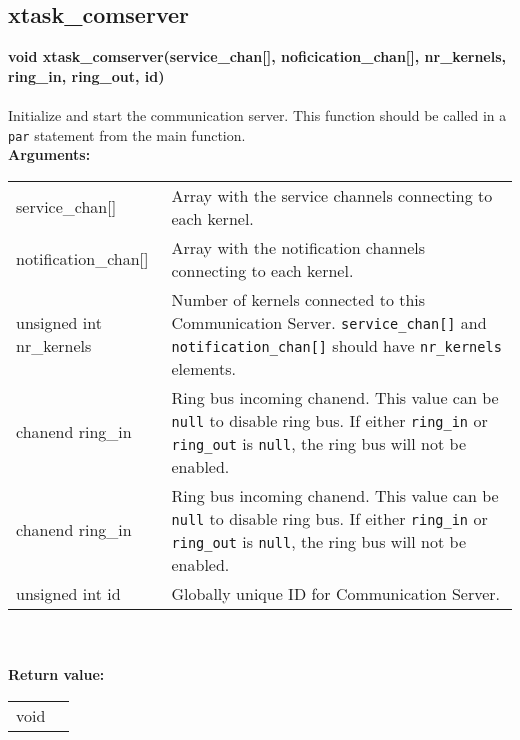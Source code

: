 \subsection{xtask\_comserver}
\noindent
\textbf{void xtask\_comserver(service\_chan[], noficication\_chan[], nr\_kernels, 
        ring\_in, ring\_out, id)}\\\\
Initialize and start the communication server.
This function should be called in a \verb|par| statement from the main function.\\

\noindent
\textbf{Arguments:}\\
\indent\begin{tabular}{ p{4.5cm}  p{9cm} }
service\_chan[]      & Array with the service channels connecting 
                       to each kernel.\\
notification\_chan[] & Array with the notification channels connecting
                       to each kernel.\\
unsigned int
nr\_kernels          & Number of kernels connected to this Communication Server.
                       \verb|service_chan[]| and \verb|notification_chan[]|
                       should have \verb|nr_kernels| elements.\\
chanend
ring\_in             & Ring bus incoming chanend. This value can be \verb|null|
                       to disable ring bus. If either \verb|ring_in| 
                       or \verb|ring_out| is \verb|null|,
                       the ring bus will not be enabled.\\
chanend
ring\_in             & Ring bus incoming chanend. This value can be \verb|null|
                       to disable ring bus. If either \verb|ring_in| 
                       or \verb|ring_out| is \verb|null|,
                       the ring bus will not be enabled.\\
unsigned int id      & Globally unique ID for Communication Server.
\end{tabular}\\\\

\noindent
\textbf{Return value:}\\
\indent\begin{tabular}{  p{4.5cm}  p{9cm} }
void & \\
\end{tabular}

